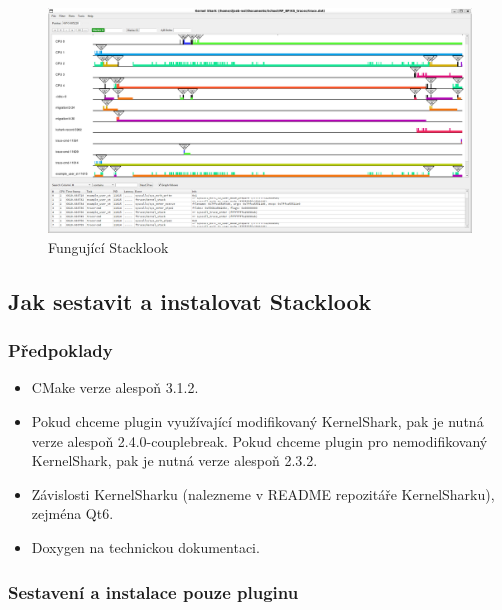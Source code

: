 \begin{figure}[p]\centering
    \includegraphics[width=140mm]{img/Stacklook/SlWorking}
    \caption{Fungující Stacklook}
    \label{SlWorking}
\end{figure}

\subsection{Jak sestavit a instalovat Stacklook}

\subsubsection*{Předpoklady}

\begin{itemize}
  \item CMake verze alespoň 3.1.2.
  \item Pokud chceme plugin využívající modifikovaný KernelShark, pak je nutná verze alespoň 2.4.0-couplebreak. Pokud chceme plugin pro nemodifikovaný KernelShark, pak je nutná verze alespoň 2.3.2.
  \item Závislosti KernelSharku (nalezneme v README repozitáře KernelSharku), zejména Qt6.
  \item Doxygen na technickou dokumentaci.
\end{itemize}

\subsubsection{Sestavení a instalace pouze pluginu}

